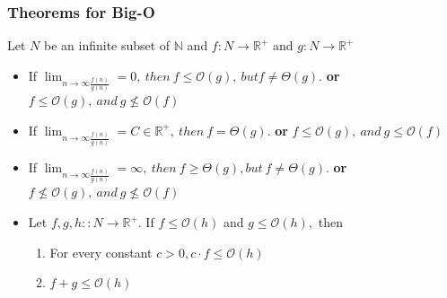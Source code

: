 \documentclass[a4paper]{article}
\begin{document}
    \subsubsection*{Theorems for Big-O}
    Let ${N}$ be an infinite subset of $\mathbb{N}$ and $f: N \to \mathbb{R}^+$ and $g: N \to \mathbb{R}^+$

    \begin{itemize}
        \item If $\lim_{n\to \infty \frac{f(n)}{g(n)}} = 0,\  then \ f\leq \mathcal{O}(g),\ but f \neq \Theta(g).$ \textbf{or} $ f\leq \mathcal{O}(g), \ and \ g \nleq \mathcal{O}(f)$
        \item If $\lim_{n\to \infty \frac{f(n)}{g(n)}} = C \in \mathbb{R}^+,\ then \ f = \Theta(g).$ 
            \textbf{or} $ f\leq \mathcal{O}(g), \ and \ g \leq \mathcal{O}(f)$
        \item If $\lim_{n\to \infty \frac{f(n)}{g(n)}} = \infty,\ then \ f \geq \Theta(g), but \ f \neq \Theta(g).$
        \textbf{or} $ f\nleq \mathcal{O}(g), \ and \ g \nleq \mathcal{O}(f)$

        \item Let $f,g,h :: N \to \mathbb{R}^+.$ If $f \leq \mathcal{O}(h)$ and $ g \leq \mathcal{O}(h),$ then
        \begin{enumerate}
            \item For every constant $c > 0, c \cdot f \leq \mathcal{O}(h)$
            \item $f + g \leq \mathcal{O}(h)$
        \end{enumerate}
    \end{itemize}

   
\end{document}
